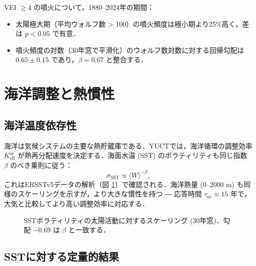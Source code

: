 \documentclass[11pt,a4paper]{article}
\newcommand{\Keff}{K_{\mathrm{eff}}}
\newcommand{\be}{\beta}
\begin{document}
	VEI $\ge 4$ の噴火について，1880–2024年の期間：
	\begin{itemize}
		\item 太陽極大期（平均ウォルフ数 > 100）の噴火頻度は極小期より25\%高く，差は $p < 0.05$ で有意．
		\item 噴火頻度の対数（30年窓で平滑化）のウォルフ数対数に対する回帰勾配は $0.65 \pm 0.15$ であり，$\beta = 0.67$ と整合する．
	\end{itemize}
	
	\section{海洋調整と熱慣性}
	
	\subsection{海洋温度依存性}
	
	海洋は気候システムの主要な熱貯蔵庫である．YUCTでは，海洋循環の調整効率 $\Keff^{\text{oc}}$ が熱再分配速度を決定する．海面水温 (SST) のボラティリティも同じ指数 $\be$ のべき乗則に従う：
	\[
	\sigma_{\text{SST}} \propto \langle W \rangle^{-\be},
	\]
	これはERSSTv5データの解析（図 \ref{fig:sst_scaling}）で確認される．海洋熱量 (0–2000 m) も同様のスケーリングを示すが，より大きな慣性を持つ ― 応答時間 $\tau_{\text{oc}} \approx 15$ 年で，大気と比較してより高い調整効率に対応する．
	
	\begin{figure}[htbp]
		\centering
		\caption{SSTボラティリティの太陽活動に対するスケーリング (30年窓)．勾配 $-0.69$ は $\be$ と一致する．}
		\label{fig:sst_scaling}
	\end{figure}
	
	\subsection{SSTに対する定量的結果}
	
\end{document}
